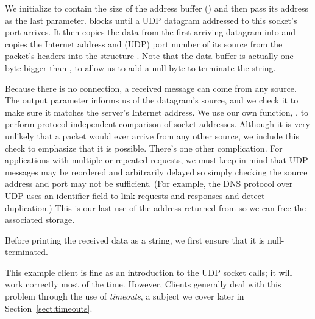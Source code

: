 \begin{topcode}

\begin{bottomcode}


We initialize  to contain the
size of the address buffer () and then
pass its address  as the  last parameter.
 blocks until a UDP datagram addressed to
this socket's port arrives.  It
then copies the data from the first arriving datagram
into  and copies the
Internet address and (UDP) port number of its source from the
packet's headers into the structure .
Note that the data buffer is actually one byte bigger than
, to allow us to add a null byte to terminate the
string.


Because there is no connection, a received message can come from
any source.  The output parameter  informs us of
the datagram's source, and we check it to make sure it matches the
server's Internet address.  We use our own function,
, to
perform protocol-independent comparison of socket addresses.  Although it is
very unlikely that a packet would ever arrive from any other source, we include
this check to emphasize that it is possible.
There's one other complication.
For applications with multiple or repeated requests, we must keep 
in mind that UDP messages may be reordered and arbitrarily delayed so
simply checking 
the source address and port
may not be sufficient.  (For example, the DNS protocol over UDP
uses an identifier field to link requests and responses and detect
duplication.)  This is our last use of the address returned
from  so we can free the associated storage.


Before printing the received data as a string, we
first ensure that it is null-terminated.

\end{bottomcode}


\end{topcode}

This example client is fine as an introduction to the UDP socket
calls; it will work correctly most of the time.  However,
Clients generally deal with this problem through the use of
\emph{timeouts}, a subject we cover later in Section~\ref{sect:timeouts}.

